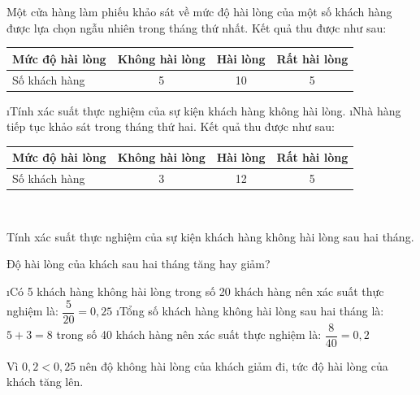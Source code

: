 \begin{bt}
	Một cửa hàng làm phiếu khảo sát về mức độ hài lòng của một số khách hàng được lựa chọn ngẫu nhiên trong tháng thứ nhất. Kết quả thu được như sau:
	\begin{center}
		\begin{tabular}{|l|c|c|c|}
			\hline
			Mức độ hài lòng&	Không hài lòng&	Hài lòng&	Rất hài lòng\\
			\hline
			Số khách hàng&	5&	10&	5\\
			\hline
		\end{tabular}
	\end{center}
	\begin{enumerate}[a),leftmargin=*]
		\i Tính xác suất thực nghiệm của sự kiện khách hàng không hài lòng.
		\i Nhà hàng tiếp tục khảo sát trong tháng thứ hai.  Kết quả thu được như sau:
		\begin{center}
			\begin{tabular}{|l|c|c|c|}
				\hline
				Mức độ hài lòng&	Không hài lòng&	Hài lòng&	Rất hài lòng\\
				\hline
				Số khách hàng&	3&	12&	5\\
				\hline
			\end{tabular}\,\,\,\,\,\,\,\,\,
		\end{center}
		Tính xác suất thực nghiệm của sự kiện khách hàng không hài lòng sau hai tháng.
		
		Độ hài lòng của khách sau hai tháng tăng hay giảm?
	\end{enumerate}
	
	\begin{loigiaichuong42}
		\begin{enumerate}[a),leftmargin=*]
			\i Có 5 khách hàng không hài lòng trong số 20 khách hàng nên xác suất thực nghiệm là: $\dfrac{5}{{20}} = 0,25$
			\i Tổng số khách hàng không hài lòng sau hai tháng là: $5 + 3 = 8$ trong số 40 khách hàng nên xác suất thực nghiệm là:   $\dfrac{8}{{40}} = 0,2$
			
			Vì $0,2 < 0,25$ nên độ không hài lòng của khách giảm đi, tức độ hài lòng của khách tăng lên.
		\end{enumerate}
	\end{loigiaichuong42}
\end{bt}
